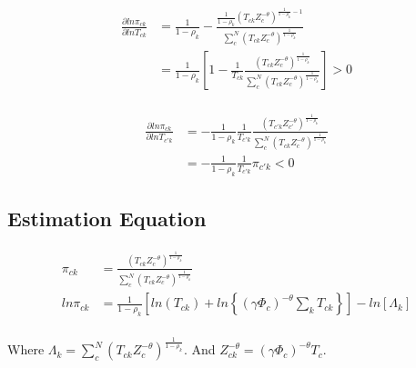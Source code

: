 \documentclass[10pt]{article}
\begin{document}
\begin{align*}
    \frac{\partial ln \pi_{ck}}{\partial ln T_{ck}} & = \frac{1}{1 - \rho_k} - \frac{\frac{1}{1 - \rho_k} (T_{ck} Z_c^{- \theta})^{\frac{1}{1 - \rho_k} - 1}}{\sum_{c}^{N} (T_{ck} Z_c^{-\theta})^{\frac{1}{1 - \rho_k}}}            \\
                                                    & = \frac{1}{1 - \rho_k} \left[1 - \frac{1}{T_{ck}} \frac{(T_{ck} Z_c^{- \theta})^{\frac{1}{1 - \rho_k}}}{\sum_{c}^{N} (T_{ck} Z_c^{-\theta})^{\frac{1}{1 - \rho_k}}}\right] > 0 \\
\end{align*}

\begin{align*}
    \frac{\partial ln \pi_{ck}}{\partial ln T_{c'k}} & = - \frac{1}{1 - \rho_k} \frac{1}{T_{c'k}} \frac{(T_{c'k} Z_{c'}^{- \theta})^{\frac{1}{1 - \rho_k}}}{\sum_{c}^{N} (T_{ck} Z_c^{-\theta})^{\frac{1}{1 - \rho_k}}} \\
                                                     & = - \frac{1}{1 - \rho_k} \frac{1}{T_{c'k}} \pi_{c'k} < 0
\end{align*}

\subsection{Estimation Equation}

\begin{align*}
    \pi_{ck}    & = \frac{(T_{ck} Z_c^{- \theta})^{\frac{1}{1 - \rho_k}}}{\sum_{c}^{N} (T_{ck} Z_c^{- \theta})^{\frac{1}{1 - \rho_k}}}                         \\
    ln \pi_{ck} & = \frac{1}{1 - \rho_k} \left[ln (T_{ck}) + ln\left\{(\gamma \Phi_c)^{- \theta} \sum_{k}^{} T_{ck}\right\}\right] - ln \left[\Lambda_k\right] \\
\end{align*}

Where $\Lambda_k = \sum_{c}^{N} (T_{ck} Z_c^{- \theta})^{\frac{1}{1 - \rho_k}}$. And $Z_{ck}^{- \theta} = (\gamma \Phi_c)^{- \theta} T_c$.

\end{document}
